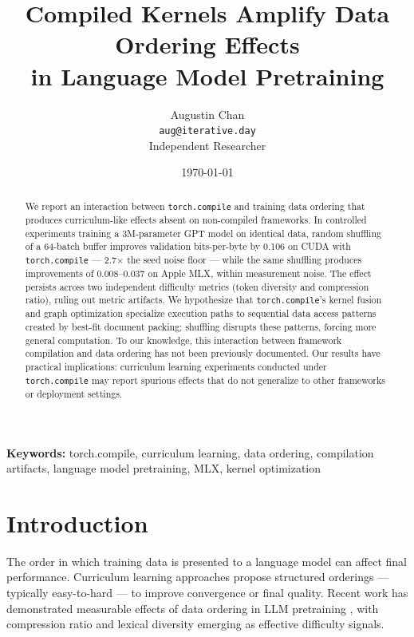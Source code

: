 \documentclass{article}
\title{Compiled Kernels Amplify Data Ordering Effects\\in Language Model Pretraining}
\author{Augustin Chan\\
\texttt{aug@iterative.day}\\
Independent Researcher}
\date{\today}
\begin{document}
\maketitle

\begin{abstract}
We report an interaction between \texttt{torch.compile} and training data ordering
that produces curriculum-like effects absent on non-compiled frameworks.
In controlled experiments training a 3M-parameter GPT model on identical data,
random shuffling of a 64-batch buffer improves validation bits-per-byte by
0.106 on CUDA with \texttt{torch.compile} --- 2.7$\times$ the seed noise floor ---
while the same shuffling produces improvements of 0.008--0.037 on Apple MLX,
within measurement noise.
The effect persists across two independent difficulty metrics (token diversity
and compression ratio), ruling out metric artifacts.
We hypothesize that \texttt{torch.compile}'s kernel fusion and graph optimization
specialize execution paths to sequential data access patterns created by
best-fit document packing; shuffling disrupts these patterns, forcing
more general computation.
To our knowledge, this interaction between framework compilation and
data ordering has not been previously documented.
Our results have practical implications: curriculum learning experiments
conducted under \texttt{torch.compile} may report spurious effects that
do not generalize to other frameworks or deployment settings.
\end{abstract}

\textbf{Keywords:} torch.compile, curriculum learning, data ordering,
compilation artifacts, language model pretraining, MLX, kernel optimization

\section{Introduction}\label{sec:introduction}

The order in which training data is presented to a language model can
affect final performance. Curriculum learning approaches
\cite{bengio2009curriculum, graves2017automated} propose structured
orderings --- typically easy-to-hard --- to improve convergence or final
quality. Recent work has demonstrated measurable effects of data ordering
in LLM pretraining \cite{beyondrandom2025, lrdecay2025}, with
compression ratio and lexical diversity emerging as effective difficulty
signals.
\end{document}
